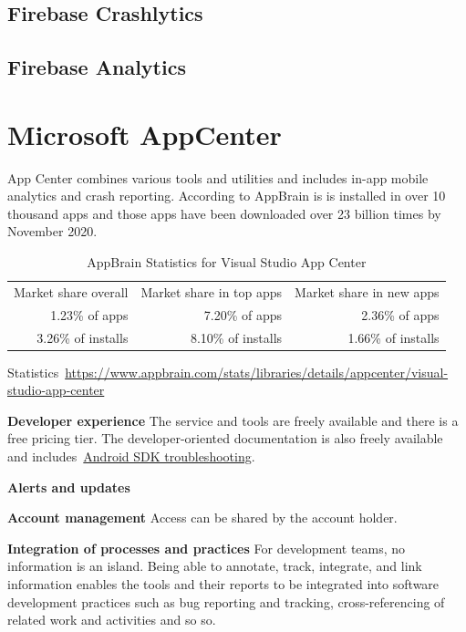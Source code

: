 \subsection{Firebase Crashlytics}

\subsection{Firebase Analytics}

\section{Microsoft AppCenter}
App Center combines various tools and utilities and includes in-app mobile analytics and crash reporting. According to AppBrain is is installed in over 10 thousand apps and those apps have been downloaded over 23 billion times by  November 2020.

\begin{table}[htbp!]
    \centering
    \footnotesize
    \begin{tabular}{rrr}
      Market share overall  &Market share in top apps &Market share in new apps  \\
      1.23\% of apps	  &7.20\% of apps &2.36\% of apps\\
      3.26\% of installs &8.10\% of installs &1.66\% of installs \\
    \end{tabular}
    \caption{AppBrain Statistics for Visual Studio App Center}
    \label{tab:appbrain_statistics_appcenter}
\end{table}

	

Statistics~\url{https://www.appbrain.com/stats/libraries/details/appcenter/visual-studio-app-center}

\textbf{Developer experience} The service and tools are freely available and there is a free pricing tier. The developer-oriented documentation is also freely available and includes~\href{https://docs.microsoft.com/en-us/appcenter/sdk/troubleshooting/android}{Android SDK troubleshooting}.

\textbf{Alerts and updates} 

\textbf{Account management} Access can be shared by the account holder.

\textbf{Integration of processes and practices} For development teams, no information is an island. Being able to annotate, track, integrate, and link information enables the tools and their reports to be integrated into software development practices such as bug reporting and tracking, cross-referencing of related work and activities and so so.

